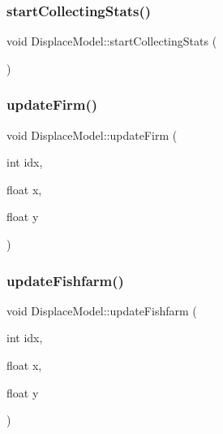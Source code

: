 \mbox{\label{class_displace_model_ac650e60252b5a661c04426222c289339}} 
\subsubsection{\texorpdfstring{startCollectingStats()}{startCollectingStats()}}
{\footnotesize\ttfamily void Displace\+Model\+::start\+Collecting\+Stats (\begin{DoxyParamCaption}{ }\end{DoxyParamCaption})}

\mbox{\label{class_displace_model_a7e6584f26267492c117bd87101bafd8f}} 
\subsubsection{\texorpdfstring{updateFirm()}{updateFirm()}}
{\footnotesize\ttfamily void Displace\+Model\+::update\+Firm (\begin{DoxyParamCaption}\item[{int}]{idx,  }\item[{float}]{x,  }\item[{float}]{y }\end{DoxyParamCaption})}

\mbox{\label{class_displace_model_a9e7123ced28762b4e26c3ab638f8e540}} 
\subsubsection{\texorpdfstring{updateFishfarm()}{updateFishfarm()}}
{\footnotesize\ttfamily void Displace\+Model\+::update\+Fishfarm (\begin{DoxyParamCaption}\item[{int}]{idx,  }\item[{float}]{x,  }\item[{float}]{y }\end{DoxyParamCaption})}

